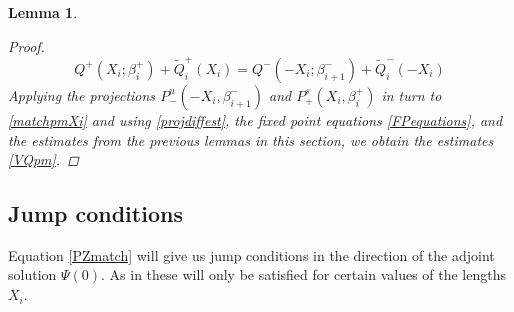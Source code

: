 \documentclass[10pt,reqno]{amsart}
\theoremstyle{plain}
\newtheorem{lemma}[theorem]{Lemma}
\theoremstyle{definition}
\theoremstyle{remark}
\numberwithin{theorem}{section}
\numberwithin{equation}{section}
\begin{document}
\begin{lemma}
\begin{proof}
\begin{equation}\label{matchpmXi}
Q^+(X_i; \beta_i^+) + \tilde{Q}_i^+(X_i) = Q^-(-X_i; \beta_{i+1}^-) + \tilde{Q}_i^-(-X_i)
\end{equation}
Applying the projections $P^u_-(-X_i, \beta_{i+1}^-)$ and $P^s_+(X_i, \beta_i^+)$ in turn to \cref{matchpmXi} and using \cref{projdiffest}, the fixed point equations \cref{FPequations}, and the estimates from the previous lemmas in this section, we obtain the estimates \cref{VQpm}.
\end{proof}
\end{lemma}

\subsection{Jump conditions}

Equation \eqref{PZmatch} will give us jump conditions in the direction of the adjoint solution $\Psi(0)$. As in \cite{SandstedeStrut,Sandstede1998} these will only be satisfied for certain values of the lengths $X_i$. 
\end{document}
